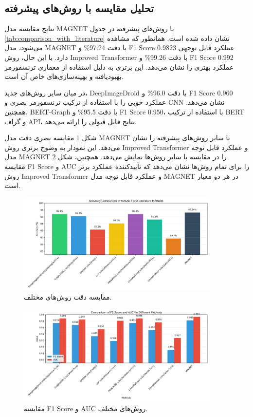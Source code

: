 \subsection{تحلیل مقایسه با روش‌های پیشرفته}
نتایج مقایسه مدل MAGNET با روش‌های پیشرفته در جدول \ref{tab:comparison_with_literature} نشان داده شده است. همانطور که مشاهده می‌شود، مدل MAGNET با دقت 97.24\% و F1 Score 0.9823 عملکرد قابل توجهی دارد. با این حال، روش Improved Transformer با دقت 99.26\% و F1 Score 0.992 عملکرد بهتری را نشان می‌دهد. این برتری به دلیل استفاده از معماری ترنسفورمر بهبودیافته و بهینه‌سازی‌های خاص آن است.

در میان سایر روش‌های جدید، DeepImageDroid با دقت 96.0\% و F1 Score 0.960 عملکرد خوبی را با استفاده از ترکیب ترنسفورمر بصری و CNN نشان می‌دهد. همچنین، BERT-Graph با دقت 95.5\% و F1 Score 0.950، با استفاده از ترکیب BERT و گراف API، نتایج قابل قبولی را ارائه می‌دهد.

شکل \ref{fig:literature_comparison_accuracy} مقایسه بصری دقت مدل MAGNET با سایر روش‌های پیشرفته را نشان می‌دهد. این نمودار به وضوح برتری روش Improved Transformer و عملکرد قابل توجه مدل MAGNET را در مقایسه با سایر روش‌ها نمایش می‌دهد. همچنین، شکل \ref{fig:literature_comparison_metrics} مقایسه F1 Score و AUC را برای تمام روش‌ها نشان می‌دهد که تأییدکننده عملکرد برتر روش Improved Transformer و عملکرد قابل توجه مدل MAGNET در هر دو معیار است.

\begin{figure}[h!]
    \centering
    \includegraphics[width=0.9\textwidth]{images/fig_literature_comparison_accuracy}
    \caption{مقایسه دقت روش‌های مختلف.}
    \label{fig:literature_comparison_accuracy}
\end{figure}

\begin{figure}[h!]
    \centering
    \includegraphics[width=0.9\textwidth]{images/fig_literature_comparison_metrics}
    \caption{مقایسه F1 Score و AUC روش‌های مختلف.}
    \label{fig:literature_comparison_metrics}
\end{figure}

